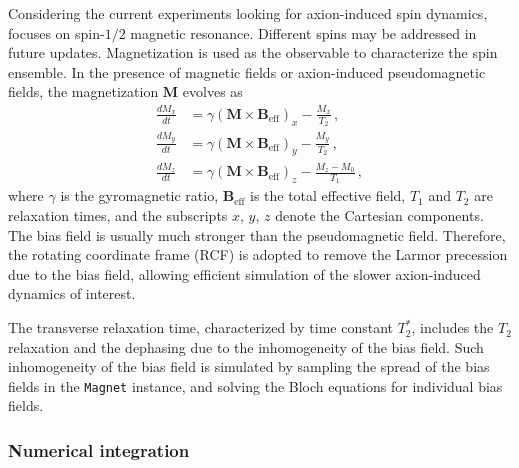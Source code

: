 Considering the current experiments looking for axion-induced spin dynamics, \axionbloch{} focuses on spin-$1/2$ magnetic resonance. 
Different spins may be addressed in future updates. 
Magnetization is used as the observable to characterize the spin ensemble. 
In the presence of magnetic fields or axion-induced pseudomagnetic fields, the magnetization $\boldsymbol{M}$ evolves as
\begin{align}
\frac{d M_x}{dt} &= \gamma \left( \boldsymbol{M} \times \boldsymbol{B}_{\mathrm{eff}} \right)_x - \frac{M_x}{T_2}\,,\label{eq:bloch_x} \\
\frac{d M_y}{dt} &= \gamma \left( \boldsymbol{M} \times \boldsymbol{B}_{\mathrm{eff}} \right)_y - \frac{M_y}{T_2}\,,\label{eq:bloch_y} \\
\frac{d M_z}{dt} &= \gamma \left( \boldsymbol{M} \times \boldsymbol{B}_{\mathrm{eff}} \right)_z - \frac{M_z - M_0}{T_1}\,,\label{eq:bloch_z}
\end{align}
where $\gamma$ is the gyromagnetic ratio, $\boldsymbol{B}_{\mathrm{eff}}$ is the total effective field, $T_1$ and $T_2$ are relaxation times, and the subscripts $x$, $y$, $z$ denote the Cartesian components. 
The bias field is usually much stronger than the pseudomagnetic field. 
Therefore, the rotating coordinate frame (RCF) is adopted to remove the Larmor precession due to the bias field, allowing efficient simulation of the slower axion-induced dynamics of interest. 

The transverse relaxation time, characterized by time constant $T_2^*$, includes the $T_2$ relaxation and the dephasing due to the inhomogeneity of the bias field. 
Such inhomogeneity of the bias field is simulated by sampling the spread of the bias fields in the \texttt{Magnet} instance, and solving the Bloch equations for individual bias fields. 

\subsubsection{Numerical integration}
\label{sec:numericalintegration}

